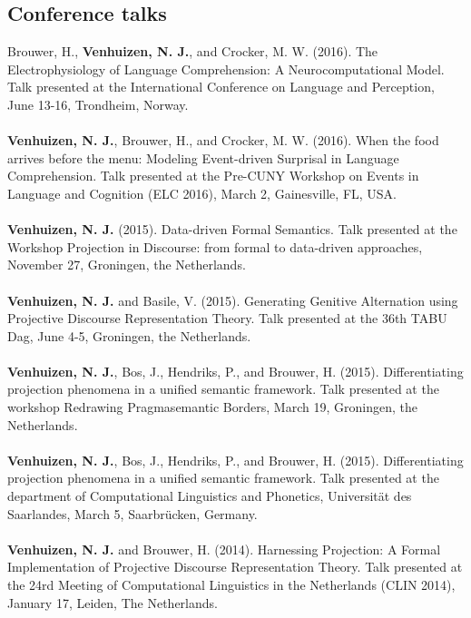 \documentclass[a4paper,10pt]{article}
\begin{document}
\subsection*{Conference talks}

\noindent
    Brouwer, H., \textbf{Venhuizen, N. J.}, and Crocker, M. W. (2016). The
    Electrophysiology of Language Comprehension: A Neurocomputational Model.
    Talk presented at the International Conference on Language and Perception,
    June 13-16, Trondheim, Norway.\\
    \\
    \textbf{Venhuizen, N. J.}, Brouwer, H., and Crocker, M. W. (2016). When the
    food arrives before the menu: Modeling Event-driven Surprisal in Language
    Comprehension. Talk presented at the Pre-CUNY Workshop on Events in
    Language and Cognition (ELC 2016), March 2, Gainesville, FL, USA.\\
    \\
    \textbf{Venhuizen, N. J.} (2015). Data-driven Formal Semantics. Talk
    presented at the Workshop Projection in Discourse: from formal to
    data-driven approaches, November 27, Groningen, the Netherlands.\\
    \\
    \textbf{Venhuizen, N. J.} and Basile, V. (2015). Generating Genitive
    Alternation using Projective Discourse Representation Theory.
    Talk presented at the 36th TABU Dag, June 4-5, Groningen, the Netherlands.\\
    \\
    \textbf{Venhuizen, N. J.}, Bos, J., Hendriks, P., and Brouwer, H. (2015). 
    Differentiating projection phenomena in a unified semantic framework.
    Talk presented at the workshop Redrawing Pragmasemantic Borders,
    March 19, Groningen, the Netherlands.\\
    \\
    \textbf{Venhuizen, N. J.}, Bos, J., Hendriks, P., and Brouwer, H. (2015). 
    Differentiating projection phenomena in a unified semantic framework.
    Talk presented at the department of Computational Linguistics and Phonetics,
    Universit{\"a}t des Saarlandes, March 5, Saarbr{\"u}cken, Germany.\\
    \\
    \textbf{Venhuizen, N. J.} and Brouwer, H. (2014). Harnessing Projection: A Formal
    Implementation of Projective Discourse Representation Theory. Talk
    presented at the 24rd Meeting of Computational Linguistics in the
    Netherlands (CLIN 2014), January 17, Leiden, The Netherlands.\\
\end{document}
